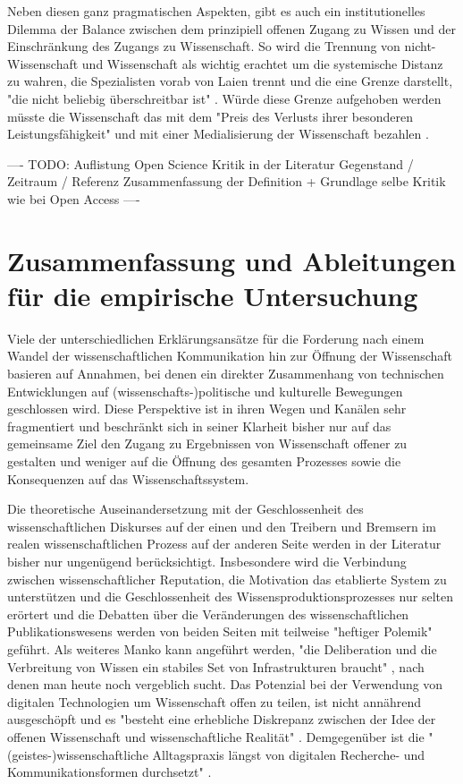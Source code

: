 Neben diesen ganz pragmatischen Aspekten, gibt es auch ein institutionelles Dilemma der Balance zwischen dem prinzipiell offenen Zugang zu Wissen und der Einschränkung des Zugangs zu Wissenschaft. So wird die Trennung von nicht-Wissenschaft und Wissenschaft als wichtig erachtet um die systemische Distanz zu wahren, die Spezialisten vorab von Laien trennt und die eine Grenze darstellt, "die nicht beliebig überschreitbar ist" \cite{weingart_2005_wissenschaft}. Würde diese Grenze aufgehoben werden müsste die Wissenschaft das mit dem "Preis des Verlusts ihrer besonderen Leistungsfähigkeit" und mit einer Medialisierung der Wissenschaft bezahlen \cite{weingart_2005_wissenschaft}.

---- TODO: Auflistung Open Science Kritik in der Literatur Gegenstand / Zeitraum / Referenz Zusammenfassung der Definition + Grundlage selbe Kritik wie bei Open Access ----

\section{Zusammenfassung und Ableitungen für die empirische Untersuchung}

Viele der unterschiedlichen Erklärungsansätze für die Forderung nach einem Wandel der wissenschaftlichen Kommunikation hin zur Öffnung der Wissenschaft basieren auf Annahmen, bei denen ein direkter Zusammenhang von technischen Entwicklungen auf (wissenschafts-)politische und kulturelle Bewegungen geschlossen wird. Diese Perspektive ist in ihren Wegen und Kanälen sehr fragmentiert und beschränkt sich in seiner Klarheit bisher nur auf das gemeinsame Ziel den Zugang zu Ergebnissen von Wissenschaft offener zu gestalten und weniger auf die Öffnung des gesamten Prozesses sowie die Konsequenzen auf das Wissenschaftssystem.

Die theoretische Auseinandersetzung mit der Geschlossenheit des wissenschaftlichen Diskurses auf der einen und den Treibern und Bremsern im realen wissenschaftlichen Prozess auf der anderen Seite werden in der Literatur bisher nur ungenügend berücksichtigt. Insbesondere wird die Verbindung zwischen wissenschaftlicher Reputation, die Motivation das etablierte System zu unterstützen und die Geschlossenheit des Wissensproduktionsprozesses nur selten erörtert und die Debatten über die Veränderungen des wissenschaftlichen Publikationswesens werden von beiden Seiten mit teilweise "heftiger Polemik" \cite[:12]{naeder_2010_open} geführt. Als weiteres Manko kann angeführt werden, "die Deliberation und die Verbreitung von Wissen ein stabiles Set von Infrastrukturen braucht" \cite{kelty_2004}, nach denen man heute noch vergeblich sucht. Das Potenzial bei der Verwendung von digitalen Technologien um Wissenschaft offen zu teilen, ist nicht annährend ausgeschöpft und es "besteht eine erhebliche Diskrepanz zwischen der Idee der offenen Wissenschaft und wissenschaftliche Realität" \cite{Scheliga_2014}. Demgegenüber ist die "(geistes-)wissenschaftliche Alltagspraxis längst von digitalen Recherche- und Kommunikationsformen durchsetzt" \cite{hagner_2015_sache_buches}.

